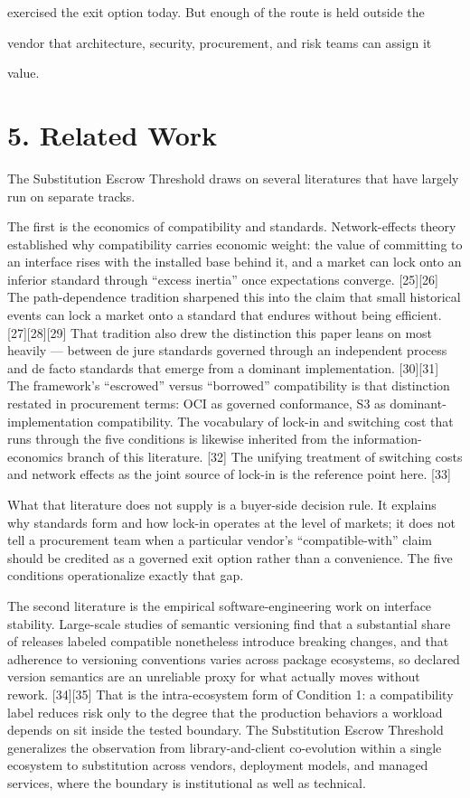\documentclass[11pt]{article}
\begin{document}
exercised the exit option today. But enough of the route is held outside the

vendor that architecture, security, procurement, and risk teams can assign it

value.

\section{5. Related Work}\label{related-work}

The Substitution Escrow Threshold draws on several literatures that have largely run on separate tracks.

The first is the economics of compatibility and standards. Network-effects theory established why compatibility carries economic weight: the value of committing to an interface rises with the installed base behind it, and a market can lock onto an inferior standard through ``excess inertia'' once expectations converge. {[}25{]}{[}26{]} The path-dependence tradition sharpened this into the claim that small historical events can lock a market onto a standard that endures without being efficient. {[}27{]}{[}28{]}{[}29{]} That tradition also drew the distinction this paper leans on most heavily --- between de jure standards governed through an independent process and de facto standards that emerge from a dominant implementation. {[}30{]}{[}31{]} The framework's ``escrowed'' versus ``borrowed'' compatibility is that distinction restated in procurement terms: OCI as governed conformance, S3 as dominant-implementation compatibility. The vocabulary of lock-in and switching cost that runs through the five conditions is likewise inherited from the information-economics branch of this literature. {[}32{]} The unifying treatment of switching costs and network effects as the joint source of lock-in is the reference point here. {[}33{]}

What that literature does not supply is a buyer-side decision rule. It explains why standards form and how lock-in operates at the level of markets; it does not tell a procurement team when a particular vendor's ``compatible-with'' claim should be credited as a governed exit option rather than a convenience. The five conditions operationalize exactly that gap.

The second literature is the empirical software-engineering work on interface stability. Large-scale studies of semantic versioning find that a substantial share of releases labeled compatible nonetheless introduce breaking changes, and that adherence to versioning conventions varies across package ecosystems, so declared version semantics are an unreliable proxy for what actually moves without rework. {[}34{]}{[}35{]} That is the intra-ecosystem form of Condition 1: a compatibility label reduces risk only to the degree that the production behaviors a workload depends on sit inside the tested boundary. The Substitution Escrow Threshold generalizes the observation from library-and-client co-evolution within a single ecosystem to substitution across vendors, deployment models, and managed services, where the boundary is institutional as well as technical.
\end{document}

